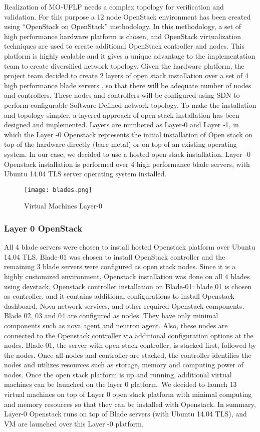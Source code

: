 \documentclass{article}
\begin{document}
Realization of MO-UFLP needs a complex topology for verification and validation. For this purpose a 12 node OpenStack environment has been created using “OpenStack on OpenStack” methodology. In this methodology, a set of high performance hardware platform is chosen, and OpenStack virtualization techniques are used to create additional OpenStack controller and nodes. This platform is highly scalable and it gives a unique advantage to the implementation team to create diversified network topology. Given the hardware platform, the project team decided to create 2 layers of open stack installation over a set of 4 high performance blade servers , so that there will be adequate number of nodes and controllers. These nodes and controllers will be configured using SDN to perform configurable Software Defined network topology. 
To make the installation and topology simpler, a layered approach of open stack installation has been designed and implemented.  Layers are numbered as Layer-0 and Layer -1, in which the Layer -0 Openstack represents the initial installation of Open stack on top of the hardware directly (bare metal) or on top of an existing operating system. In our case, we decided to use a hosted open stack installation. Layer -0 Openstack installation is performed over 4 high performance blade servers, with Ubuntu 14.04 TLS server operating system installed. 


\begin{figure}[h]
	\caption{Virtual Machines Layer-0}
	\centering
	\texttt{[image: blades.png]}
\end{figure}
\subsubsection{Layer 0 OpenStack} 
All 4 blade servers were chosen to install hosted Openstack platform over Ubuntu 14.04 TLS. Blade-01 was chosen to install OpenStack controller and the remaining 3 blade servers were configured as open stack nodes. Since it is a highly customized environment, Openstack installation was done on all 4 blades using devstack. 
Openstack controller installation on Blade-01: blade 01 is chosen as controller, and it contains additional configurations to install Openstack dashboard, Nova network services, and other required Openstack components. 
Blade 02, 03 and 04 are configured as nodes. They have only minimal components such as nova agent and  neutron agent. Also, these nodes are connected to the Openstack controller via additional configuration options at the nodes. 
Blade-01, the server with open stack controller, is stacked first, followed by the nodes. Once all nodes and controller are stacked, the controller identifies the nodes and utilizes resources such as storage, memory and computing power of nodes. Once the open stack platform is up and running, additional virtual machines can be launched on the layer 0 platform.
We decided to launch 13 virtual machines on top of Layer 0 open stack platform with minimal computing and memory resources so that they can be installed with Openstack. In summary, Layer-0 Openstack runs on top of Blade servers (with Ubuntu 14.04 TLS), and VM are launched over this Layer -0 platform.\\
\end{document}
